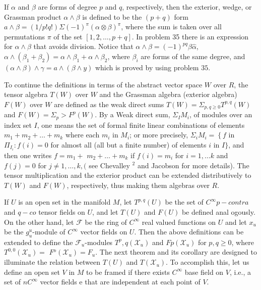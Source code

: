 \documentclass[10pt]{article}
\begin{document}
If $\alpha$ and $\beta$ are forms of degree $p$ and $q$, respectively, then the exterior, wedge, or Grassman product $\alpha \wedge \beta$ is defined to be the $(p+q)$ form $a \wedge \beta=(1 / p ! q !) \Sigma(-1)^{\pi}(\alpha \otimes \beta)^{\pi}$, where the sum is taken over all permutations $\pi$ of the set $[1,2, \ldots, p+q]$. In problem 35 there is an expression for $\alpha \wedge \beta$ that avoids division. Notice that $\alpha \wedge \beta=(-1)^{p q} \beta \hat{\alpha}$, $\alpha \wedge\left(\beta_{1}+\beta_{2}\right)=\alpha \wedge \beta_{1}+\alpha \wedge \beta_{2}$, where $\beta_{i}$ are forms of the same degree, and $(\alpha \wedge \beta) \wedge \gamma=a \wedge(\beta \wedge y)$ which is proved by using problem $35 .$

To continue the definitions in terms of the abstract vector space $W$ over $R$, the tensor algebra $T(W)$ over $W$ and the Grassman algebra (exterior algebra) $F(W)$ over $W$ are defined as the weak direct sums $T(W)=\Sigma_{p, q \geq 0} T^{p, q}(W)$ and $F(W)=\Sigma_{p}>F^{p}(W)$. By a Weak direct sum, $\Sigma_{I} M_{i}$, of modules over an index set $I$, one means the set of formal finite linear combinations of elements $m_{1}+m_{2}+\ldots+m_{k}$ where each $m_{i}$ in $M_{i}$; or more precisely, $\Sigma_{i} M_{i}=\left\{f\right.$ in $\Pi_{I_{i}}: f(i)=0$ for almost all (all but a finite number) of elements $i$ in $I\}$, and then one writes $f=m_{1}+$ $m_{2}+\ldots+m_{k}$ if $f(i)=m_{i}$ for $i=1, \ldots k$ and $f(j)=0$ for $j \neq 1, \ldots, k,($ see Chevalley ${ }^{2}$ and Jacobson for more details). The tensor multiplication and the exterior product can be extended distributively to $T(W)$ and $F(W)$, respectively, thus making them algebras over $R$.

If $U$ is an open set in the manifold $M$, let $T^{p, q}(U)$ be the set of $C^{\infty} p-c o n t r a$ and $q-c o$ tensor fields on $U$, and let $T(U)$ and $F(U)$ be defined anal ogously. On the other hand, let $\mathcal{F}$ be the ring of $C^{\infty}$ real valued functions on $U$ and let $x_{u}$ be the $g_{u}^{u}$-module of $C^{\infty}$ vector fields on $U$. Then the above definitions can be extended to define the $\mathcal{F}_{u}$-modules $T^{p}, q\left(\mathcal{X}_{u}\right)$ and $F p\left(\mathcal{X}_{u}\right)$ for $p, q \geq 0$, where $T^{0,0}\left(\mathcal{X}_{u}\right)=$ $F{ }^{o}\left(\mathcal{X}_{u}\right)=F_{u}$. The next theorem and its corollary are designed to illuminate the relation between $T(U)$ and $T\left(\mathcal{X}_{u}\right)$. To accomplish this, let us define an open set $V$ in $M$ to be framed if there exists $C^{\infty}$ base field on $V$, i.e., a set of $n C^{\infty}$ vector fields e that are independent at each point of $V$.
\end{document}
